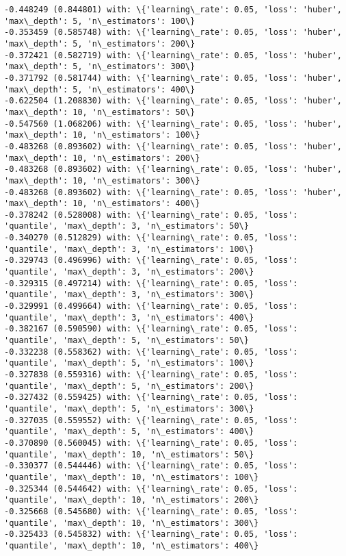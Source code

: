 \documentclass[11pt]{article}
\begin{document}
\begin{Verbatim}[commandchars=\\\{\}]
-0.448249 (0.844801) with: \{'learning\_rate': 0.05, 'loss': 'huber', 'max\_depth': 5, 'n\_estimators': 100\}
-0.353459 (0.585748) with: \{'learning\_rate': 0.05, 'loss': 'huber', 'max\_depth': 5, 'n\_estimators': 200\}
-0.372421 (0.582719) with: \{'learning\_rate': 0.05, 'loss': 'huber', 'max\_depth': 5, 'n\_estimators': 300\}
-0.371792 (0.581744) with: \{'learning\_rate': 0.05, 'loss': 'huber', 'max\_depth': 5, 'n\_estimators': 400\}
-0.622504 (1.208830) with: \{'learning\_rate': 0.05, 'loss': 'huber', 'max\_depth': 10, 'n\_estimators': 50\}
-0.547560 (1.068206) with: \{'learning\_rate': 0.05, 'loss': 'huber', 'max\_depth': 10, 'n\_estimators': 100\}
-0.483268 (0.893602) with: \{'learning\_rate': 0.05, 'loss': 'huber', 'max\_depth': 10, 'n\_estimators': 200\}
-0.483268 (0.893602) with: \{'learning\_rate': 0.05, 'loss': 'huber', 'max\_depth': 10, 'n\_estimators': 300\}
-0.483268 (0.893602) with: \{'learning\_rate': 0.05, 'loss': 'huber', 'max\_depth': 10, 'n\_estimators': 400\}
-0.378242 (0.528008) with: \{'learning\_rate': 0.05, 'loss': 'quantile', 'max\_depth': 3, 'n\_estimators': 50\}
-0.340270 (0.512829) with: \{'learning\_rate': 0.05, 'loss': 'quantile', 'max\_depth': 3, 'n\_estimators': 100\}
-0.329743 (0.496996) with: \{'learning\_rate': 0.05, 'loss': 'quantile', 'max\_depth': 3, 'n\_estimators': 200\}
-0.329315 (0.497214) with: \{'learning\_rate': 0.05, 'loss': 'quantile', 'max\_depth': 3, 'n\_estimators': 300\}
-0.329991 (0.499664) with: \{'learning\_rate': 0.05, 'loss': 'quantile', 'max\_depth': 3, 'n\_estimators': 400\}
-0.382167 (0.590590) with: \{'learning\_rate': 0.05, 'loss': 'quantile', 'max\_depth': 5, 'n\_estimators': 50\}
-0.332238 (0.558362) with: \{'learning\_rate': 0.05, 'loss': 'quantile', 'max\_depth': 5, 'n\_estimators': 100\}
-0.327838 (0.559316) with: \{'learning\_rate': 0.05, 'loss': 'quantile', 'max\_depth': 5, 'n\_estimators': 200\}
-0.327432 (0.559425) with: \{'learning\_rate': 0.05, 'loss': 'quantile', 'max\_depth': 5, 'n\_estimators': 300\}
-0.327035 (0.559552) with: \{'learning\_rate': 0.05, 'loss': 'quantile', 'max\_depth': 5, 'n\_estimators': 400\}
-0.370890 (0.560045) with: \{'learning\_rate': 0.05, 'loss': 'quantile', 'max\_depth': 10, 'n\_estimators': 50\}
-0.330377 (0.544446) with: \{'learning\_rate': 0.05, 'loss': 'quantile', 'max\_depth': 10, 'n\_estimators': 100\}
-0.325344 (0.544642) with: \{'learning\_rate': 0.05, 'loss': 'quantile', 'max\_depth': 10, 'n\_estimators': 200\}
-0.325668 (0.545680) with: \{'learning\_rate': 0.05, 'loss': 'quantile', 'max\_depth': 10, 'n\_estimators': 300\}
-0.325433 (0.545832) with: \{'learning\_rate': 0.05, 'loss': 'quantile', 'max\_depth': 10, 'n\_estimators': 400\}

\end{Verbatim}
\end{document}
